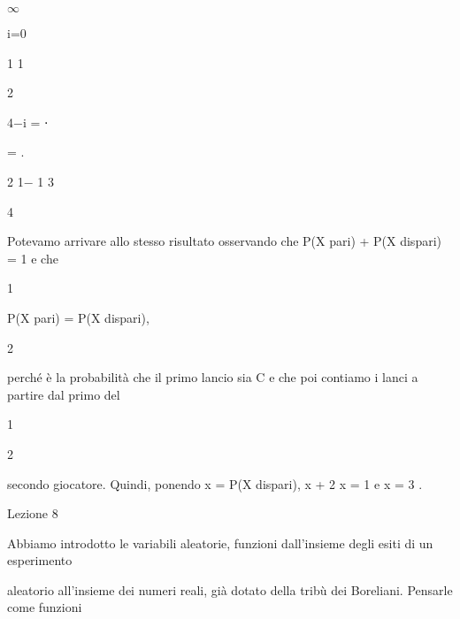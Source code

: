 \documentclass[a4paper,portrait,12pt]{article}
\begin{document}
$\infty$


\begin{flushleft}
i=0
\end{flushleft}





1 1


2


\begin{flushleft}
4$-$i = ⋅
\end{flushleft}


= .


2 1$-$ 1 3


4





\begin{flushleft}
Potevamo arrivare allo stesso risultato osservando che P(X pari) + P(X dispari) = 1 e che
\end{flushleft}


1


\begin{flushleft}
P(X pari) = P(X dispari),
\end{flushleft}


2


\begin{flushleft}
perch\'{e} \`{e} la probabilit\`{a} che il primo lancio sia C e che poi contiamo i lanci a partire dal primo del
\end{flushleft}


1


2


\begin{flushleft}
secondo giocatore. Quindi, ponendo x = P(X dispari), x + 2 x = 1 e x = 3 .
\end{flushleft}


\begin{flushleft}
Lezione 8
\end{flushleft}





\begin{flushleft}
Abbiamo introdotto le variabili aleatorie, funzioni dall'insieme degli esiti di un esperimento
\end{flushleft}


\begin{flushleft}
aleatorio all'insieme dei numeri reali, gi\`{a} dotato della tribù dei Boreliani. Pensarle come funzioni
\end{flushleft}
\end{document}
